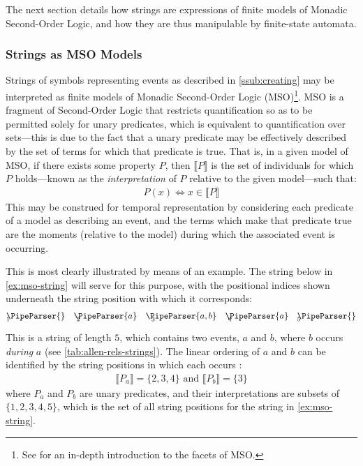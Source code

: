 \documentclass[a4paper,12pt,leqno]{article}
\newcommand{\vph}[1]{\vphantom{#1}}
\newcommand{\ebox}[1]{\fbox{$\vph{'(),}#1$}}
\newcommand{\EventString}[1]{%
	\renewcommand*{\do}[1]{\ebox{##1}}%
	\PipeParser{#1}%
}
\begin{document}
The next section details how strings are expressions of finite models of Monadic Second-Order Logic, and how they are thus manipulable by finite-state automata.


\subsubsection{Strings as MSO Models}\label{ssub:mso}

Strings of symbols representing events as described in \cref{ssub:creating} may be interpreted as finite models of Monadic Second-Order Logic (MSO)\footnote{See \citet[ch. 7]{Libkin2004} for an in-depth introduction to the facets of MSO.}. MSO is a fragment of Second-Order Logic that restricts quantification so as to be permitted solely for unary predicates, which is equivalent to quantification over sets---this is due to the fact that a unary predicate may be effectively described by the set of terms for which that predicate is true. That is, in a given model of MSO, if there exists some property $P$, then $\llbracket P \rrbracket$ is the set of individuals for which $P$ holds---known as the \textit{interpretation} of $P$ relative to the given model---such that:
\begin{align}\label{impl:prop-interpretation}
	P(x) \Longleftrightarrow x \in \llbracket P \rrbracket
\end{align}
This may be construed for temporal representation by considering each predicate of a model as describing an event, and the terms which make that predicate true are the moments (relative to the model) during which the associated event is occurring.

This is most clearly illustrated by means of an example. The string below in \cref{ex:mso-string} will serve for this purpose, with the positional indices shown underneath the string position with which it corresponds:
\begin{alignat}{5}\label{ex:mso-string}
	&\EventString{{}} && \EventString{a} && \EventString{a,b} && \EventString{a} && \EventString{{}}\\[-1.2em]
	&{\scriptstyle 1} && {\scriptstyle ~2} && {\scriptstyle ~~3} && {\scriptstyle ~4} && {\scriptstyle 5}\notag
\end{alignat}
This is a string of length $5$, which contains two events, $a$ and $b$, where $b$ occurs \textit{during} $a$ (see \cref{tab:allen-rels-strings}). The linear ordering of $a$ and $b$ can be identified by the string positions in which each occurs \citep{fernando2016regular,Fernando2018}:
\begin{align}
	\llbracket P_a \rrbracket = \{2,3,4\} \text{ and } \llbracket P_b \rrbracket = \{3\}
\end{align}
where $P_a$ and $P_b$ are unary predicates, and their interpretations are subsets of $\{1,2,3,4,5\}$, which is the set of all string positions for the string in \cref{ex:mso-string}.
\end{document}
